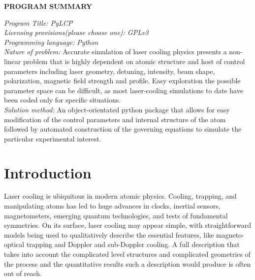 \documentclass[final,5p,times,twocolumn]{elsarticle}
\begin{document}



{\bf PROGRAM SUMMARY}

\begin{small}
\noindent
{\em Program Title: PyLCP}                                          \\
{\em Licensing provisions(please choose one): GPLv3}                                   \\
{\em Programming language: Python}                                   \\

{\em Nature of problem:} Accurate simulation of laser cooling physics presents a non-linear problem that is highly dependent on atomic structure and host of control parameters including laser geometry, detuning, intensity, beam shape, polarization, magnetic field strength and profile.  Easy exploration the possible parameter space can be difficult, as most laser-cooling simulations to date have been coded only for specific situations.\\
  
{\em Solution method:}
 An object-orientated python package that allows for easy modification of the control parameters and internal structure of the atom followed by automated construction of the governing equations to simulate the particular experimental interest.\\


\end{small}


\section{Introduction}
\label{sec:intro}
Laser cooling is ubiquitous in modern atomic physics.  Cooling, trapping, and manipulating atoms has led to huge advances in clocks, inertial sensors, magnetometers, emerging quantum technologies, and tests of fundamental symmetries.  On its surface, laser cooling may appear simple, with straightforward models being used to qualitatively describe the essential features, like magneto-optical trapping and Doppler and sub-Doppler cooling.  A full description that takes into account the complicated level structures and complicated geometries of the process and the quantitative results such a description would produce is often out of reach.
\end{document}
